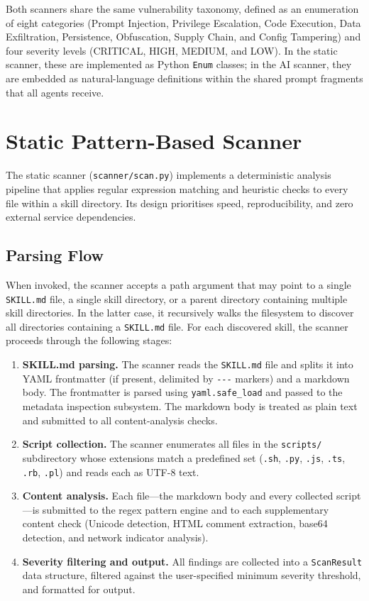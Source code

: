 Both scanners share the same vulnerability taxonomy, defined as an enumeration of eight categories (Prompt Injection, Privilege Escalation, Code Execution, Data Exfiltration, Persistence, Obfuscation, Supply Chain, and Config Tampering) and four severity levels (CRITICAL, HIGH, MEDIUM, and LOW). In the static scanner, these are implemented as Python \texttt{Enum} classes; in the AI scanner, they are embedded as natural-language definitions within the shared prompt fragments that all agents receive.

\section{Static Pattern-Based Scanner}
\label{sec:static}

The static scanner (\texttt{scanner/scan.py}) implements a deterministic analysis pipeline that applies regular expression matching and heuristic checks to every file within a skill directory. Its design prioritises speed, reproducibility, and zero external service dependencies.

\subsection{Parsing Flow}

When invoked, the scanner accepts a path argument that may point to a single \texttt{SKILL.md} file, a single skill directory, or a parent directory containing multiple skill directories. In the latter case, it recursively walks the filesystem to discover all directories containing a \texttt{SKILL.md} file. For each discovered skill, the scanner proceeds through the following stages:

\begin{enumerate}
    \item \textbf{SKILL.md parsing.} The scanner reads the \texttt{SKILL.md} file and splits it into YAML frontmatter (if present, delimited by \texttt{-{}-{}-} markers) and a markdown body. The frontmatter is parsed using \texttt{yaml.safe\_load} and passed to the metadata inspection subsystem. The markdown body is treated as plain text and submitted to all content-analysis checks.
    \item \textbf{Script collection.} The scanner enumerates all files in the \texttt{scripts/} subdirectory whose extensions match a predefined set (\texttt{.sh}, \texttt{.py}, \texttt{.js}, \texttt{.ts}, \texttt{.rb}, \texttt{.pl}) and reads each as UTF-8 text.
    \item \textbf{Content analysis.} Each file---the markdown body and every collected script---is submitted to the regex pattern engine and to each supplementary content check (Unicode detection, HTML comment extraction, base64 detection, and network indicator analysis).
    \item \textbf{Severity filtering and output.} All findings are collected into a \texttt{ScanResult} data structure, filtered against the user-specified minimum severity threshold, and formatted for output.
\end{enumerate}

